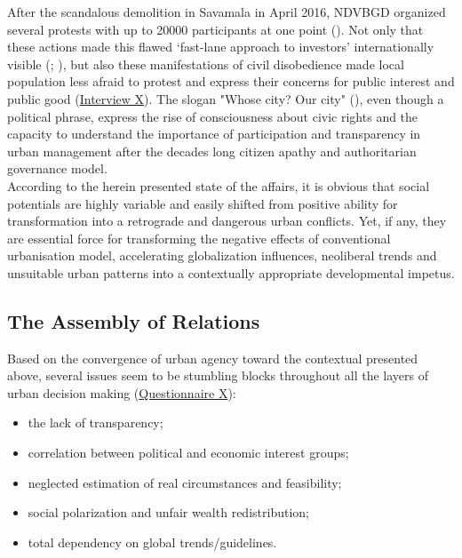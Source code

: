 \documentclass[11pt]{report}
\begin{document}
After the scandalous demolition in Savamala in April 2016, NDVBGD organized several protests with up to 20000 participants at one point (\cite{BalkanInsight2016}).
Not only that these actions made this flawed ‘fast-lane approach to investors’ internationally visible (\href{ref}{\citealt{eror_belgrades_2015}}; \href{ref}{\citealt{wright_belgrade_2015}}), but also these manifestations of civil disobedience made local population less afraid to protest and express their concerns for public interest and public good
(\href{InterviewX}{Interview X}).
The slogan "Whose city? Our city" (\href{ref}{\citealt{tulimirovic_protest_2016}}), even though a political phrase, express the rise of consciousness about civic rights and the capacity to understand the importance of participation and transparency in urban management after the decades long citizen apathy and authoritarian governance model.
\\

According to the herein presented state of the affairs, it is obvious that social potentials are highly variable and easily shifted from positive ability for transformation into a retrograde and dangerous urban conflicts. 
Yet, if any, they are essential force for transforming the negative effects of conventional urbanisation model, accelerating globalization influences, neoliberal trends and unsuitable urban patterns into a contextually appropriate developmental impetus. 

\subsection{The Assembly of Relations}

Based on the convergence of urban agency toward  the contextual presented above, several issues seem to be stumbling blocks throughout all the layers of urban decision making
(\href{Questionnaire Experts Post-socialist}{Questionnaire X}):

\begin{itemize}
\item the lack of transparency;
\item correlation between political and economic interest groups;
\item neglected estimation of real circumstances and feasibility;
\item social polarization and unfair wealth redistribution;
\item total dependency on global trends/guidelines.
\end{itemize}
\end{document}
